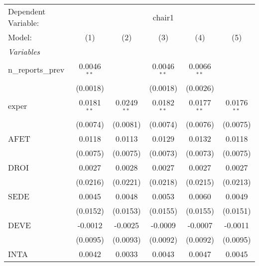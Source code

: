 
\begingroup
\centering
\begin{tabular}{lccccc}
   \tabularnewline \midrule \midrule
   Dependent Variable: & \multicolumn{5}{c}{chair1}\\
   Model:                                    & (1)            & (2)            & (3)            & (4)            & (5)\\  
   \midrule
   \emph{Variables}\\
   n\_reports\_prev                          & 0.0046$^{**}$  &                & 0.0046$^{**}$  & 0.0066$^{**}$  &   \\   
                                             & (0.0018)       &                & (0.0018)       & (0.0026)       &   \\   
   exper                                     & 0.0181$^{**}$  & 0.0249$^{**}$  & 0.0182$^{**}$  & 0.0177$^{**}$  & 0.0176$^{**}$\\   
                                             & (0.0074)       & (0.0081)       & (0.0074)       & (0.0076)       & (0.0075)\\   
   AFET                                      & 0.0118         & 0.0113         & 0.0129         & 0.0132         & 0.0118\\   
                                             & (0.0075)       & (0.0075)       & (0.0073)       & (0.0073)       & (0.0075)\\   
   DROI                                      & 0.0027         & 0.0028         & 0.0027         & 0.0027         & 0.0027\\   
                                             & (0.0216)       & (0.0221)       & (0.0218)       & (0.0215)       & (0.0213)\\   
   SEDE                                      & 0.0045         & 0.0048         & 0.0053         & 0.0060         & 0.0049\\   
                                             & (0.0152)       & (0.0153)       & (0.0155)       & (0.0155)       & (0.0151)\\   
   DEVE                                      & -0.0012        & -0.0025        & -0.0009        & -0.0007        & -0.0011\\   
                                             & (0.0095)       & (0.0093)       & (0.0092)       & (0.0092)       & (0.0095)\\   
   INTA                                      & 0.0042         & 0.0033         & 0.0043         & 0.0047         & 0.0045\\   

\end{tabular}
